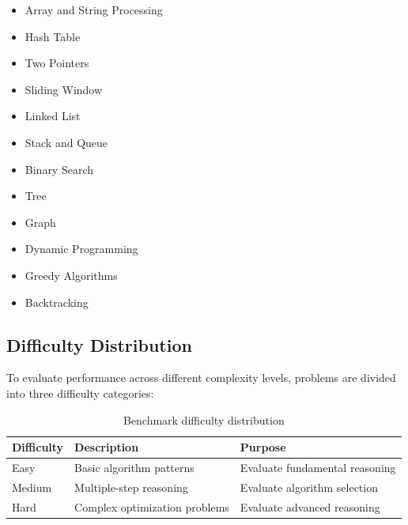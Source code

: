 \begin{itemize}

\item Array and String Processing

\item Hash Table

\item Two Pointers

\item Sliding Window

\item Linked List

\item Stack and Queue

\item Binary Search

\item Tree

\item Graph

\item Dynamic Programming

\item Greedy Algorithms

\item Backtracking

\end{itemize}


\subsection{Difficulty Distribution}

To evaluate performance across different complexity levels, problems are
divided into three difficulty categories:

\begin{table}[h]

\centering

\begin{tabular}{lll}

\toprule

Difficulty & Description & Purpose \\

\midrule

Easy & Basic algorithm patterns & Evaluate fundamental reasoning \\

Medium & Multiple-step reasoning & Evaluate algorithm selection \\

Hard & Complex optimization problems & Evaluate advanced reasoning \\

\bottomrule

\end{tabular}

\caption{Benchmark difficulty distribution}

\end{table}



